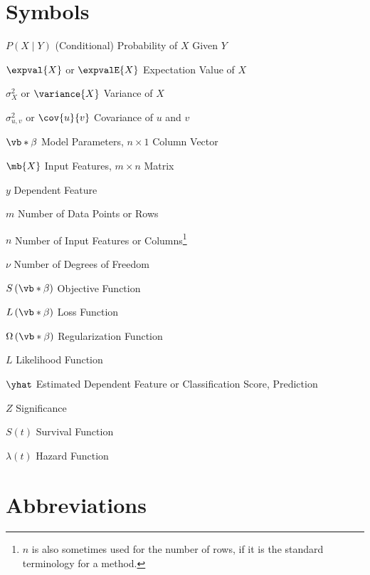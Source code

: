 \abbreviations

\section*{Symbols}

\begin{symbollist}
  \item[$P\left(X \mid Y\right)$] (Conditional) Probability of $X$ Given $Y$
  \item[$\expval{X}$ or $\expvalE{X}$] Expectation Value of $X$
  \item[$\sigma_{X}^{2}$ or $\variance{X}$] Variance of $X$
  \item[$\sigma_{u,v}^{2}$ or $\cov{u}{v}$] Covariance of $u$ and $v$
  \item[$\vb*{\beta}$] Model Parameters, $n \times 1$ Column Vector
  \item[$\mb{X}$] Input Features, $m \times n$ Matrix
  \item[$y$] Dependent Feature
  \item[$m$] Number of Data Points or Rows
  \item[$n$] Number of Input Features or Columns\footnote{$n$ is also sometimes used for the number of rows, if it is the standard terminology for a method.}
  \item[$\nu$] Number of Degrees of Freedom
  \item[$S\left(\vb*{\beta}\right)$] Objective Function
  \item[$L\left(\vb*{\beta}\right)$] Loss Function
  \item[$\Omega\left(\vb*{\beta}\right)$] Regularization Function
  \item[$L$] Likelihood Function
  \item[$\yhat$] Estimated Dependent Feature or Classification Score, Prediction %
  \item[$Z$] Significance
  \item[$S\left(t\right)$] Survival Function
  \item[$\lambda\left(t\right)$] Hazard Function
\end{symbollist}

\clearpage
\section*{Abbreviations}

